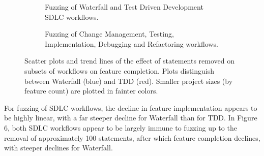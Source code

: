 \documentclass{llncs}
\begin{document}
\begin{figure}
  \centering
  \begin{subfigure}{2.3in}
    \caption{Fuzzing of Waterfall and Test Driven Development SDLC workflows.}
  \end{subfigure}
  \hfill
  \begin{subfigure}{2.3in}
    \caption{Fuzzing of Change Management, Testing, Implementation, Debugging and Refactoring workflows.}  
  \end{subfigure}
  
  \caption{Scatter plots and trend lines of the effect of statements removed on subsets of workflows on feature
    completion. Plots distinguish between Waterfall (blue) and TDD (red).  Smaller project sizes (by feature count) are
    plotted in fainter colors.}
  \label{fig:fuzzing-features}
\end{figure}


For fuzzing of SDLC workflows, the decline in feature implementation appears to be highly linear, with a far steeper
decline for Waterfall than for TDD.  In Figure 6, both SDLC workflows appear to be largely immune to fuzzing up to the
removal of approximately 100 statements, after which feature completion declines, with steeper declines for Waterfall.
\end{document}
